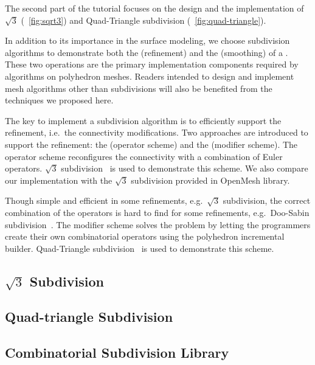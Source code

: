 The second part of the tutorial focuses on the design and the
implementation of $\sqrt{3}$ (\figurename\ \ref{fig:sqrt3}) and
Quad-Triangle subdivision (\figurename\ \ref{fig:quad-triangle}).

In addition to its importance in the surface modeling, we choose
subdivision algorithms to demonstrate both the
 (refinement) and the
 (smoothing) of a
\cgalpoly . These two operations are the
primary implementation components required by algorithms on polyhedron
meshes. Readers intended to design and implement mesh algorithms other
than subdivisions will also be benefited from the techniques we
proposed here.

The key to implement a subdivision algorithm is to efficiently support
the refinement, i.e.\ the connectivity modifications. Two approaches
are introduced to support the refinement: the 
(operator scheme) and the 
(modifier scheme).  The operator scheme reconfigures the connectivity
with a combination of Euler operators. $\sqrt{3}$
subdivision~\cite{sqrt3} is used to demonstrate this scheme. We also
compare our implementation with the $\sqrt{3}$ subdivision provided in
OpenMesh library.

Though simple and efficient in some refinements, e.g.\ $\sqrt{3}$
subdivision, the correct combination of the operators is hard to find
for some refinements, e.g.\ Doo-Sabin subdivision~\cite{ds}. The
modifier scheme solves the problem by letting the programmers create
their own combinatorial operators using the polyhedron incremental
builder. Quad-Triangle subdivision~\cite{qts,l-pg-03} is used to
demonstrate this scheme.

\subsection*{$\sqrt{3}$ Subdivision}


\subsection*{Quad-triangle Subdivision}


\subsection*{Combinatorial Subdivision Library}


